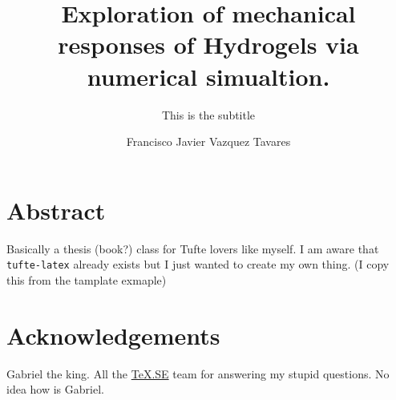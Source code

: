 \documentclass[12pt,colorful,boxey]{tufte-style-thesis}
\author{Francisco Javier Vazquez Tavares}
\title{Exploration of mechanical responses of Hydrogels via numerical simualtion.}
\subtitle{This is the subtitle}
\begin{document}
\maketitle

\justifying   

\chapter{Abstract}
Basically a thesis (book?) class for Tufte lovers like myself. 
I am aware that \texttt{tufte-latex} already exists but I just wanted to create my own thing.
(I copy this from the tamplate exmaple)

\chapter{Acknowledgements}
Gabriel the king. 
All the \href{https://tex.stackexchange.com/}{\TeX.SE} team for answering my stupid questions.
No idea how is Gabriel.

\tableofcontents
\listoffigures
\listoftables
\listoflistings


\mainmatter



\end{document}
